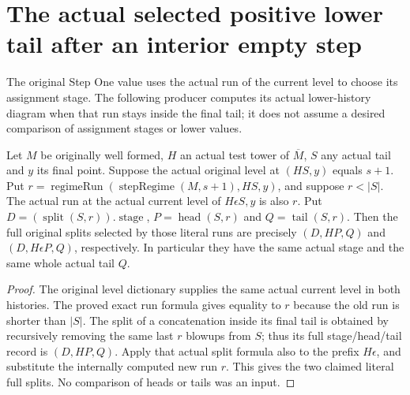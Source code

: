 \section{The actual selected positive lower tail after an interior empty step}

The original Step One value uses the actual run of the current level to choose
its assignment stage.  The following producer computes its actual lower-history
diagram when that run stays inside the final tail; it does not assume a desired
comparison of assignment stages or lower values.

\begin{lemma}
\label{hir:original-interior-selected-positive-short-splits}
\leanok
{}
Let $M$ be originally well formed, $H$ an actual test tower of $\overline M$,
$S$ any actual tail and $y$ its final point. Suppose the actual original level
at $(HS,y)$ equals $s+1$. Put
$r=\operatorname{regimeRun}(\operatorname{stepRegime}(M,s+1),HS,y)$, and suppose
$r<|S|$.  The actual run at the actual current level of $H\epsilon S,y$ is
also $r$.  Put $D=(\operatorname{split}(S,r)).\operatorname{stage}$,
$P=\operatorname{head}(S,r)$ and $Q=\operatorname{tail}(S,r)$.
Then the full original splits selected by those literal runs are precisely
$(D,HP,Q)$ and $(D,H\epsilon P,Q)$, respectively.  In particular they have
the same actual stage and the same whole actual tail $Q$.
\end{lemma}
\begin{proof}
The original level dictionary supplies the same actual current level in both
histories.  The proved exact run formula gives equality to $r$ because the
old run is shorter than $|S|$.  The split of a concatenation inside its final
tail is obtained by recursively removing the same last $r$ blowups from $S$;
thus its full stage/head/tail record is $(D,HP,Q)$.  Apply that actual split
formula also to the prefix $H\epsilon$, and substitute the internally computed
new run $r$.  This gives the two claimed literal full splits.  No comparison
of heads or tails was an input.
\end{proof}

